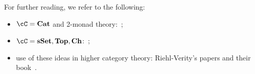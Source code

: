 \documentclass[a4paper,11pt,oneside,openany]{scrbook}
\begin{document}
For further reading, we refer to the following:
\begin{itemize}
	\item $\cC=\Cat$ and 2-monad theory:~\cite{lack20102};
	\item $\cC=\sSet,\Top,\mathbf{Ch}$:~\cite{hovey2007model};
	\item use of these ideas in higher category theory: Riehl-Verity's papers
	      and their book~\cite{riehl2018elements}.
\end{itemize}

\backmatter

\nocite{*}
\printbibliography
\end{document}
